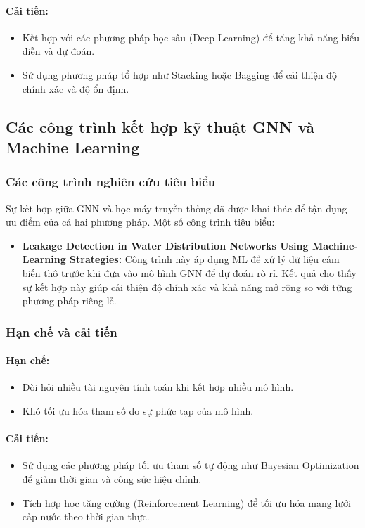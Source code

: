 \paragraph{Cải tiến:}
\begin{itemize}
    \item Kết hợp với các phương pháp học sâu (Deep Learning) để tăng khả năng biểu diễn và dự đoán.
    \item Sử dụng phương pháp tổ hợp như Stacking hoặc Bagging để cải thiện độ chính xác và độ ổn định.
\end{itemize}

\subsection{Các công trình kết hợp kỹ thuật GNN và Machine Learning}

\subsubsection*{Các công trình nghiên cứu tiêu biểu}
Sự kết hợp giữa GNN và học máy truyền thống đã được khai thác để tận dụng ưu điểm của cả hai phương pháp. Một số công trình tiêu biểu:

\begin{itemize}
    \item \textbf{Leakage Detection in Water Distribution Networks Using Machine-Learning Strategies:} Công trình này\cite{Sousa2023} áp dụng ML để xử lý dữ liệu cảm biến thô trước khi đưa vào mô hình GNN để dự đoán rò rỉ. Kết quả cho thấy sự kết hợp này giúp cải thiện độ chính xác và khả năng mở rộng so với từng phương pháp riêng lẻ.
\end{itemize}

\subsubsection*{Hạn chế và cải tiến}

\paragraph{Hạn chế:}
\begin{itemize}
    \item Đòi hỏi nhiều tài nguyên tính toán khi kết hợp nhiều mô hình.
    \item Khó tối ưu hóa tham số do sự phức tạp của mô hình.
\end{itemize}

\paragraph{Cải tiến:}
\begin{itemize}
    \item Sử dụng các phương pháp tối ưu tham số tự động như Bayesian Optimization để giảm thời gian và công sức hiệu chỉnh.
    \item Tích hợp học tăng cường (Reinforcement Learning) để tối ưu hóa mạng lưới cấp nước theo thời gian thực.
\end{itemize}

